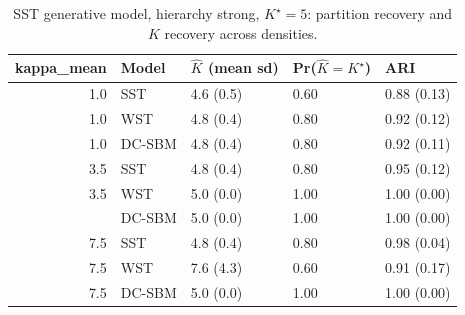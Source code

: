 \begin{table}
\centering
\caption{SST generative model, hierarchy strong, $K^\star=5$: partition recovery and $K$ recovery across densities.}
\centering
\begin{tabular}[t]{rllll}
\toprule
kappa_mean & Model & $\hat K$ (mean sd) & Pr($\hat K = K^\star$) & ARI\\
\midrule
1.0 & SST & 4.6 (0.5) & 0.60 & 0.88 (0.13)\\
1.0 & WST & 4.8 (0.4) & 0.80 & 0.92 (0.12)\\
1.0 & DC-SBM & 4.8 (0.4) & 0.80 & 0.92 (0.11)\\
3.5 & SST & 4.8 (0.4) & 0.80 & 0.95 (0.12)\\
3.5 & WST & 5.0 (0.0) & 1.00 & 1.00 (0.00)\\
\addlinespace
3.5 & DC-SBM & 5.0 (0.0) & 1.00 & 1.00 (0.00)\\
7.5 & SST & 4.8 (0.4) & 0.80 & 0.98 (0.04)\\
7.5 & WST & 7.6 (4.3) & 0.60 & 0.91 (0.17)\\
7.5 & DC-SBM & 5.0 (0.0) & 1.00 & 1.00 (0.00)\\
\bottomrule
\end{tabular}
\end{table}
